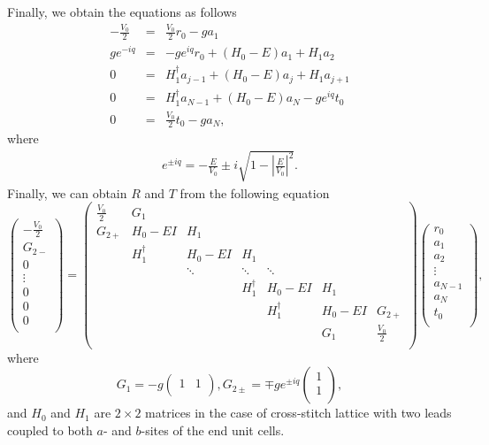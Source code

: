 \documentclass[report,epsfig,pre]{revtex4}
\begin{document}
Finally, we obtain the equations as follows
\begin{eqnarray}
 -\frac{V_0}{2} &=& \frac{V_0}{2} r_0 - g a_1 \\
 g e^{-i q} &=& - g e^{i q} r_0 + (H_{0} - E) a_{1} + H_{1} a_{2} \\
 0 &=& H_{1}^{\dagger} a_{j-1} + (H_{0} - E) a_{j} + H_{1} a_{j+1} \\
 0 &=& H_{1}^{\dagger} a_{N-1} + (H_{0} - E) a_{N} - g e^{i q} t_0 \\
 0 &=& \frac{V_0}{2} t_0 - g a_{N}, 
\end{eqnarray}
where 
\begin{eqnarray}
 e^{\pm i q} = - \frac{E}{V_{0}} \pm i \sqrt{1 - \left|\frac{E}{V_{0}}\right|^2}. 
\end{eqnarray}
Finally, we can obtain $R$ and $T$ from the following equation
\begin{equation}
 \left(\begin{array}{c}
 -\frac{V_0}{2} \\
 G_{2-} \\
 0 \\
 \vdots \\
 0 \\
 0 \\
 0 \\
\end{array}\right)=
 \left(\begin{array}{ccccccc}
 \frac{V_0}{2} & G_1 & & & & & \\
 G_{2+} & H_0 - E I & H_1 & & & &  \\
  & H_1^{\dagger} & H_0 - E I & H_1 & & &  \\
  & & \ddots & \ddots & \ddots && \\
  &&& H_1^{\dagger} & H_0 - E I & H_1 & \\
  &&&& H_1^{\dagger} & H_0 - E I & G_{2+} \\
  &&&&& G_1 & \frac{V_0}{2} \\
\end{array}\right)
\left(\begin{array}{c}
 r_0 \\
 a_1 \\
 a_2 \\
 \vdots \\
 a_{N-1} \\
 a_{N} \\
 t_0 \\
\end{array}\right),
\end{equation}
where
\begin{equation}
G_1 = - g
\left(\begin{array}{cc}
 1 &  1 \\
\end{array}\right),
G_{2\pm} = \mp g e^{\pm iq}
 \left(\begin{array}{c}
 1 \\
 1 \\
\end{array}\right),
\end{equation}
and $H_0$ and $H_1$ are $2 \times 2$ matrices in the case of cross-stitch lattice with two leads coupled to both $a$- and $b$-sites of the end unit cells.
\end{document}
